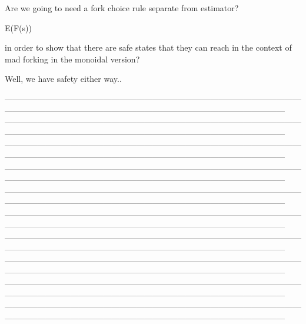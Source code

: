 \documentclass{article}
\theoremstyle{definition}
\begin{document}
Are we going to need a fork choice rule separate from estimator?

E(F(s))

in order to show that there are safe states that they can reach in the context of mad forking in the monoidal version?

Well, we have safety either way..



\fi



\iffalse




------------------------------------------------------------------------------------------------------------------------------------------------------------------------------------------------------------------
------------------------------------------------------------------------------------------------------------------------------------------------------------------------------------------------------------------
------------------------------------------------------------------------------------------------------------------------------------------------------------------------------------------------------------------
------------------------------------------------------------------------------------------------------------------------------------------------------------------------------------------------------------------
------------------------------------------------------------------------------------------------------------------------------------------------------------------------------------------------------------------
------------------------------------------------------------------------------------------------------------------------------------------------------------------------------------------------------------------
------------------------------------------------------------------------------------------------------------------------------------------------------------------------------------------------------------------
------------------------------------------------------------------------------------------------------------------------------------------------------------------------------------------------------------------
------------------------------------------------------------------------------------------------------------------------------------------------------------------------------------------------------------------
------------------------------------------------------------------------------------------------------------------------------------------------------------------------------------------------------------------
\end{document}
